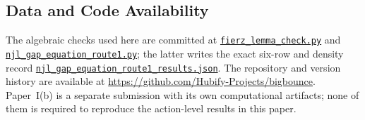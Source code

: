 \documentclass[aps,prd,twocolumn,superscriptaddress,showpacs,preprintnumbers,nofootinbib,longbibliography,floatfix]{revtex4-2}
\newcommand{\artifactnamed}[2]{\href{https://github.com/Hubify-Projects/bigbounce/blob/main/#1}{\nolinkurl{#2}}}
\begin{document}
\subsection*{Data and Code Availability}

The algebraic checks used here are committed at
\artifactnamed{arxiv/scripts/fierz_lemma_check.py}{fierz_lemma_check.py} and
\artifactnamed{arxiv/scripts/njl_gap_equation_route1.py}{njl_gap_equation_route1.py}; the latter writes the
exact six-row and density record
\artifactnamed{arxiv/scripts/njl_gap_equation_route1_results.json}{njl_gap_equation_route1_results.json}.  The repository and
version history are available at
\url{https://github.com/Hubify-Projects/bigbounce}.  Paper~I(b) is a separate
submission with its own computational artifacts; none of them is required to
reproduce the action-level results in this paper.

\appendix
\end{document}
